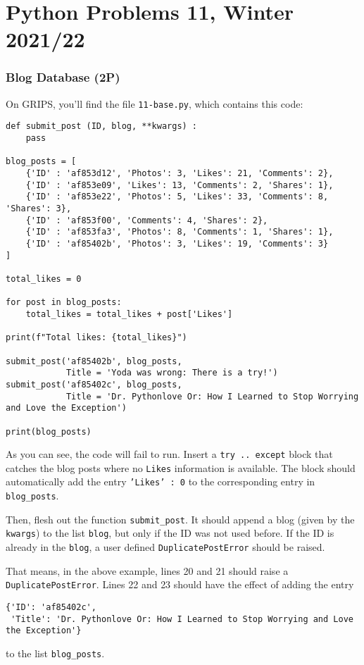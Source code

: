\documentclass[
	ngerman,
	fontsize=10pt,
	parskip=half,
	titlepage=true,
	DIV=12
]{scrartcl}
\newcommand*{\inPy}[1]{\texttt{#1}}
\begin{document}
\part*{Python Problems 11, Winter 2021/22}
\section{Blog Database (2\;P)}
On GRIPS, you'll find the file \texttt{11-base.py}, which contains this code:
\begin{verbatim}
def submit_post (ID, blog, **kwargs) :
    pass

blog_posts = [
    {'ID' : 'af853d12', 'Photos': 3, 'Likes': 21, 'Comments': 2},
    {'ID' : 'af853e09', 'Likes': 13, 'Comments': 2, 'Shares': 1},
    {'ID' : 'af853e22', 'Photos': 5, 'Likes': 33, 'Comments': 8, 'Shares': 3},
    {'ID' : 'af853f00', 'Comments': 4, 'Shares': 2},
    {'ID' : 'af853fa3', 'Photos': 8, 'Comments': 1, 'Shares': 1},
    {'ID' : 'af85402b', 'Photos': 3, 'Likes': 19, 'Comments': 3}
]

total_likes = 0

for post in blog_posts:
    total_likes = total_likes + post['Likes']

print(f"Total likes: {total_likes}")

submit_post('af85402b', blog_posts,
            Title = 'Yoda was wrong: There is a try!')
submit_post('af85402c', blog_posts,
            Title = 'Dr. Pythonlove Or: How I Learned to Stop Worrying and Love the Exception')

print(blog_posts)
\end{verbatim}

As you can see, the code will fail to run. Insert a \inPy{try .. except} block that catches the blog posts where no \texttt{Likes} information is available. The block should automatically add the entry \inPy{'Likes' : 0} to the corresponding entry in \texttt{blog\_posts}.

Then, flesh out the function \texttt{submit\_post}. It should append a blog (given by the \texttt{kwargs}) to the list \texttt{blog}, but only if the ID was not used before. If the ID is already in the \texttt{blog}, a user defined \texttt{DuplicatePostError} should be raised.

That means, in the above example, lines 20 and 21 should raise a \texttt{DuplicatePostError}. Lines 22 and 23 should have the effect of adding the entry
\begin{verbatim}
{'ID': 'af85402c',
 'Title': 'Dr. Pythonlove Or: How I Learned to Stop Worrying and Love the Exception'}
\end{verbatim}
to the list \texttt{blog\_posts}.
\end{document}
